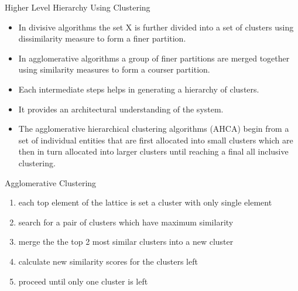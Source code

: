 \documentclass{beamer}
\begin{document}
\begin{frame}{Higher Level Hierarchy Using Clustering}
	\begin{itemize}
		\item In divisive algorithms the set X is further divided into a set of clusters using dissimilarity measure to form a finer partition.
		\item In agglomerative algorithms a group of finer partitions are merged together using
		similarity measures to form a courser partition.
		\item Each intermediate steps helps in generating a
		hierarchy of clusters.
		\item It provides an architectural understanding of the system.
		\item The agglomerative hierarchical clustering algorithms (AHCA) begin from a set of individual entities that are first allocated into small clusters which are then in turn allocated
		into larger clusters until reaching a final all inclusive clustering.
	\end{itemize}
\end{frame}
\begin{frame}{Agglomerative Clustering}
	\begin{algorithm}[H]
		\caption{Agglomerative Clustering}
		\begin{enumerate}
			\item each top element of the lattice is set a cluster with only single element
			\item search for a pair of clusters which have maximum similarity 
			\item merge the the top 2 most similar clusters into a new cluster
			\item calculate new similarity scores for the clusters left
			\item proceed until only one cluster is left
		\end{enumerate}
	\end{algorithm}
\end{frame}
\end{document}
